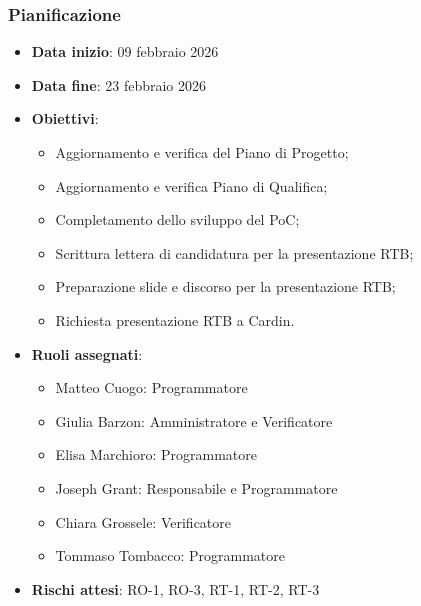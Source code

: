 \documentclass[11pt,a4paper]{article}
\begin{document}
\subsubsection{Pianificazione}
\begin{itemize}
    \item \textbf{Data inizio}: 09 febbraio 2026
    \item \textbf{Data fine}: 23 febbraio 2026
    \item \textbf{Obiettivi}:
    \begin{itemize}
        \item Aggiornamento e verifica del Piano di Progetto;
        \item Aggiornamento e verifica Piano di Qualifica;
        \item Completamento dello sviluppo del PoC;
        \item Scrittura lettera di candidatura per la presentazione RTB;
        \item Preparazione slide e discorso per la presentazione RTB;
        \item Richiesta presentazione RTB a Cardin.
    \end{itemize}
    \item \textbf{Ruoli assegnati}:
    \begin{itemize}
        \item Matteo Cuogo: Programmatore
        \item Giulia Barzon: Amministratore e Verificatore
        \item Elisa Marchioro: Programmatore
        \item Joseph Grant: Responsabile e Programmatore
        \item Chiara Grossele: Verificatore
        \item Tommaso Tombacco: Programmatore
    \end{itemize}
    \item \textbf{Rischi attesi}: RO-1, RO-3, RT-1, RT-2, RT-3
\end{itemize}
\end{document}
